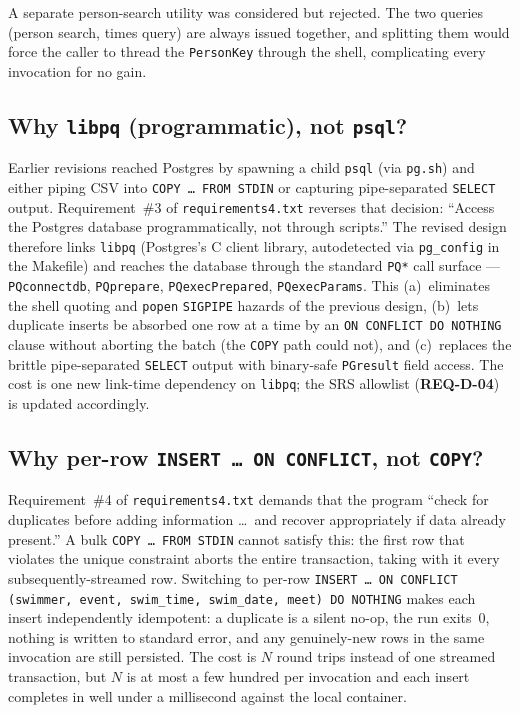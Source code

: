 \documentclass[12pt]{article}
\newcommand{\code}[1]{\texttt{#1}}
\newcommand{\req}[1]{\textbf{#1}}
\begin{document}
A separate person-search utility was considered but rejected.
The two queries (person search, times query) are always issued
together, and splitting them would force the caller to thread
the \code{PersonKey} through the shell, complicating every
invocation for no gain.

\subsection{Why \texttt{libpq} (programmatic), not \texttt{psql}?}

Earlier revisions reached Postgres by spawning a child
\texttt{psql} (via \texttt{pg.sh}) and either piping CSV into
\texttt{COPY \dots\ FROM~STDIN} or capturing pipe-separated
\texttt{SELECT} output.  Requirement~\#3 of
\texttt{requirements4.txt} reverses that decision: ``Access the
Postgres database programmatically, not through scripts.''  The
revised design therefore links \texttt{libpq} (Postgres's C
client library, autodetected via \texttt{pg\_config} in the
Makefile) and reaches the database through the standard
\code{PQ*} call surface --- \code{PQconnectdb},
\code{PQprepare}, \code{PQexecPrepared}, \code{PQexecParams}.
This (a)~eliminates the shell quoting and \texttt{popen}
\texttt{SIGPIPE} hazards of the previous design,
(b)~lets duplicate inserts be absorbed one row at a time by an
\texttt{ON~CONFLICT~DO~NOTHING} clause without aborting the
batch (the \texttt{COPY} path could not), and (c)~replaces the
brittle pipe-separated \texttt{SELECT} output with binary-safe
\code{PGresult} field access.  The cost is one new link-time
dependency on \code{libpq}; the SRS allowlist (\req{REQ-D-04})
is updated accordingly.

\subsection{Why per-row \texttt{INSERT \dots\ ON~CONFLICT}, not \texttt{COPY}?}

Requirement~\#4 of \texttt{requirements4.txt} demands that the
program ``check for duplicates before adding information \dots\
and recover appropriately if data already present.''  A bulk
\texttt{COPY \dots\ FROM~STDIN} cannot satisfy this: the first
row that violates the unique constraint aborts the entire
transaction, taking with it every subsequently-streamed row.
Switching to per-row \texttt{INSERT \dots\ ON CONFLICT
(swimmer, event, swim\_time, swim\_date, meet) DO NOTHING}
makes each insert independently idempotent: a duplicate is a
silent no-op, the run exits~0, nothing is written to standard
error, and any genuinely-new rows in the same invocation are
still persisted.  The cost is $N$ round trips instead of one
streamed transaction, but $N$ is at most a few hundred per
invocation and each insert completes in well under a
millisecond against the local container.
\end{document}
